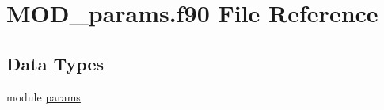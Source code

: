\hypertarget{MOD__params_8f90}{\section{M\-O\-D\-\_\-params.\-f90 File Reference}
\label{MOD__params_8f90}
}
\subsection*{Data Types}
\begin{DoxyCompactItemize}
\item 
module \hyperlink{classparams}{params}
\end{DoxyCompactItemize}
